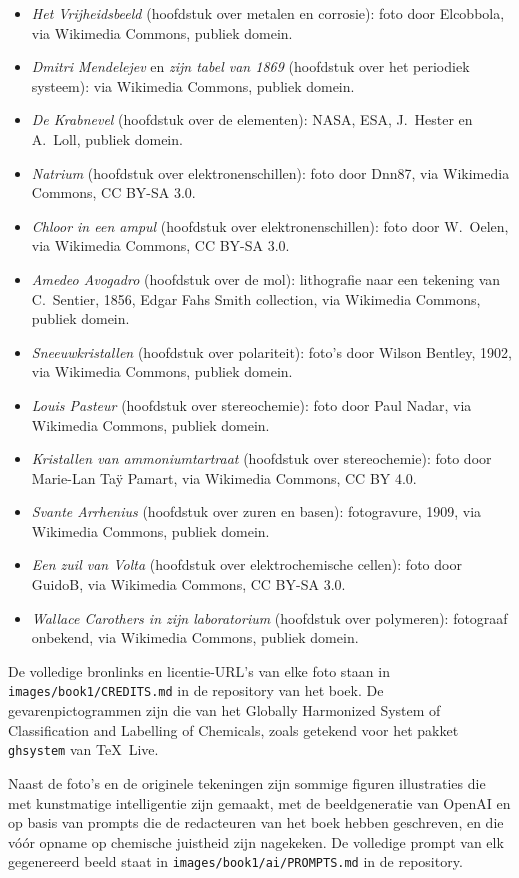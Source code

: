 \begin{itemize}
        via Wikimedia Commons, CC BY-SA 3.0.
  \item \emph{Het Vrijheidsbeeld} (hoofdstuk over metalen en corrosie):
        foto door Elcobbola, via Wikimedia Commons, publiek domein.
  \item \emph{Dmitri Mendelejev} en \emph{zijn tabel van 1869} (hoofdstuk
        over het periodiek systeem): via Wikimedia Commons, publiek domein.
  \item \emph{De Krabnevel} (hoofdstuk over de elementen): NASA, ESA,
        J.~Hester en A.~Loll, publiek domein.
  \item \emph{Natrium} (hoofdstuk over elektronenschillen): foto door
        Dnn87, via Wikimedia Commons, CC BY-SA 3.0.
  \item \emph{Chloor in een ampul} (hoofdstuk over elektronenschillen):
        foto door W.~Oelen, via Wikimedia Commons, CC BY-SA 3.0.
  \item \emph{Amedeo Avogadro} (hoofdstuk over de mol): lithografie naar
        een tekening van C.~Sentier, 1856, Edgar Fahs Smith collection, via
        Wikimedia Commons, publiek domein.
  \item \emph{Sneeuwkristallen} (hoofdstuk over polariteit): foto's door
        Wilson Bentley, 1902, via Wikimedia Commons, publiek domein.
  \item \emph{Louis Pasteur} (hoofdstuk over stereochemie): foto door Paul
        Nadar, via Wikimedia Commons, publiek domein.
  \item \emph{Kristallen van ammoniumtartraat} (hoofdstuk over
        stereochemie): foto door Marie-Lan Taÿ Pamart, via Wikimedia
        Commons, CC BY 4.0.
  \item \emph{Svante Arrhenius} (hoofdstuk over zuren en basen):
        fotogravure, 1909, via Wikimedia Commons, publiek domein.
  \item \emph{Een zuil van Volta} (hoofdstuk over elektrochemische
        cellen): foto door GuidoB, via Wikimedia Commons, CC BY-SA 3.0.
  \item \emph{Wallace Carothers in zijn laboratorium} (hoofdstuk over
        polymeren): fotograaf onbekend, via Wikimedia Commons, publiek
        domein.
\end{itemize}

De volledige bronlinks en licentie-URL's van elke foto staan in
\texttt{images/book1/CREDITS.md} in de repository van het boek.
De gevarenpictogrammen zijn die van het Globally Harmonized System of
Classification and Labelling of Chemicals, zoals getekend voor het pakket
\texttt{ghsystem} van \TeX\ Live.

\bigskip
Naast de foto's en de originele tekeningen zijn sommige figuren
illustraties die met kunstmatige intelligentie zijn gemaakt, met de
beeldgeneratie van OpenAI en op basis van prompts die de redacteuren van
het boek hebben geschreven, en die vóór opname op chemische juistheid zijn
nagekeken. De volledige prompt van elk gegenereerd beeld staat in
\texttt{images/book1/ai/PROMPTS.md} in de repository.
\clearpage
